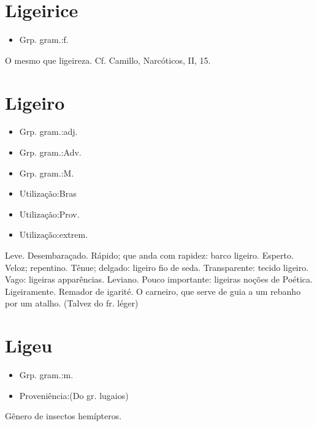 \section{Ligeirice}
\begin{itemize}
\item {Grp. gram.:f.}
\end{itemize}
O mesmo que \textunderscore ligeireza\textunderscore . Cf. Camillo, \textunderscore Narcóticos\textunderscore , II, 15.
\section{Ligeiro}
\begin{itemize}
\item {Grp. gram.:adj.}
\end{itemize}
\begin{itemize}
\item {Grp. gram.:Adv.}
\end{itemize}
\begin{itemize}
\item {Grp. gram.:M.}
\end{itemize}
\begin{itemize}
\item {Utilização:Bras}
\end{itemize}
\begin{itemize}
\item {Utilização:Prov.}
\end{itemize}
\begin{itemize}
\item {Utilização:extrem.}
\end{itemize}
Leve.
Desembaraçado.
Rápido; que anda com rapidez: \textunderscore barco ligeiro\textunderscore .
Esperto.
Veloz; repentino.
Tênue; delgado: \textunderscore ligeiro fio de seda\textunderscore .
Transparente: \textunderscore tecido ligeiro\textunderscore .
Vago: \textunderscore ligeiras apparências\textunderscore .
Leviano.
Pouco importante: \textunderscore ligeiras noções de Poética\textunderscore .
Ligeiramente.
Remador de igarité.
O carneiro, que serve de guia a um rebanho por um atalho.
(Talvez do fr. \textunderscore léger\textunderscore )
\section{Ligeu}
\begin{itemize}
\item {Grp. gram.:m.}
\end{itemize}
\begin{itemize}
\item {Proveniência:(Do gr. \textunderscore lugaios\textunderscore )}
\end{itemize}
Gênero de insectos hemípteros.
